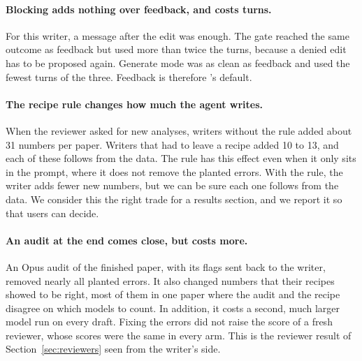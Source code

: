 \paragraph{Blocking adds nothing over feedback, and costs turns.}
For this writer, a message after the edit was enough. The gate reached the same outcome as feedback but used more
than twice the turns, because a denied edit has to be proposed again. Generate mode was as clean as feedback and used
the fewest turns of the three. Feedback is therefore \tool{}'s default.

\paragraph{The recipe rule changes how much the agent writes.}
When the reviewer asked for new analyses, writers without the rule added about 31 numbers per paper. Writers that had
to leave a recipe added 10 to 13, and each of these follows from the data. The rule has this effect even when it only
sits in the prompt, where it does not remove the planted errors. With the rule, the writer adds fewer new numbers, but
we can be sure each one follows from the data. We consider this the right trade for a results section, and we report
it so that users can decide.

\paragraph{An audit at the end comes close, but costs more.}
An Opus audit of the finished paper, with its flags sent back to the writer, removed nearly all planted errors. It
also changed numbers that their recipes showed to be right, most of them in one paper where the audit and the recipe
disagree on which models to count. In addition, it costs a second, much larger model run on every draft. Fixing the errors did
not raise the score of a fresh reviewer, whose scores were the same in every arm. This is the reviewer result of
Section~\ref{sec:reviewers} seen from the writer's side.

